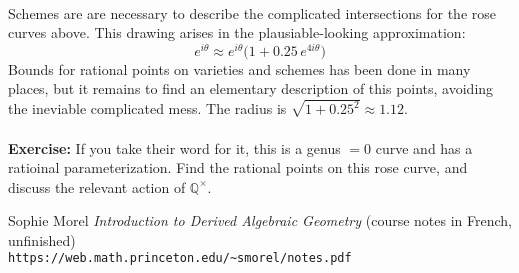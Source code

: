 \documentclass[12pt]{article}
\begin{document}
 \\ 
Schemes are are necessary to describe the complicated intersections for the rose curves above.  This drawing arises in the plausiable-looking approximation:
$$ e^{i\theta} \approx e^{i\theta} \big( 1  + 0.25\, e^{4i\theta} \big) $$
Bounds for rational points on varieties and schemes has been done in many places, but it remains to find an elementary description of this points, avoiding the ineviable complicated mess.  The radius is $\sqrt{1 + 0.25^2} \approx 1.12$. \\ \\
\textbf{Exercise:} If you take their word for it, this is a genus $=0$ curve and has a ratioinal parameterization.  Find the rational points on this rose curve, and discuss the relevant action of $\mathbb{Q}^\times$.

\begin{thebibliography}{} 

\item Sophie Morel \textit{Introduction to Derived Algebraic Geometry} (course notes in French, unfinished)\\ \texttt{https://web.math.princeton.edu/\~{}smorel/notes.pdf}

\end{thebibliography}
\end{document}
